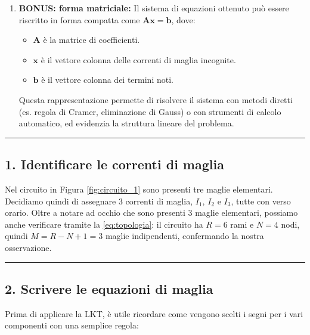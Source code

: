\begin{enumerate}
    \item \textbf{BONUS: forma matriciale:} 
    Il sistema di equazioni ottenuto può essere riscritto in forma compatta come $\mathbf{A} \mathbf{x} = \mathbf{b}$, dove:
    \begin{itemize}
        \item $\mathbf{A}$ è la matrice di coefficienti. 
        \item $\mathbf{x}$ è il vettore colonna delle correnti di maglia incognite.
        \item $\mathbf{b}$ è il vettore colonna dei termini noti.
    \end{itemize}
    Questa rappresentazione permette di risolvere il sistema con metodi diretti (es. regola di Cramer, eliminazione di Gauss) o con strumenti di calcolo automatico, ed evidenzia la struttura lineare del problema.
\end{enumerate}
\hrule

\subsection*{1. Identificare le correnti di maglia}
Nel circuito in Figura \ref{fig:circuito_1} sono presenti tre maglie elementari. Decidiamo quindi di assegnare 3 correnti di maglia, \(I_1\), \(I_2\) e \(I_3\), tutte con verso orario. Oltre a notare ad occhio che sono presenti 3 maglie elementari, possiamo anche verificare tramite la \ref{eq:topologia}: il circuito ha \(R = 6\) rami e \(N = 4\) nodi, quindi \(M = R-N+1 = 3\) maglie indipendenti, confermando la nostra osservazione.\\



\hrule

\subsection*{2. Scrivere le equazioni di maglia}

Prima di applicare la LKT, è utile ricordare come vengono scelti i segni per i vari componenti con una semplice regola:
\begin{center}
\end{center}

